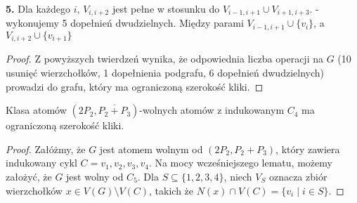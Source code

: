 \documentclass[polish]{beamer}
\begin{document}
\begin{frame}

    \textbf{5.} Dla każdego $i$, $V_{i,i+2}$ jest pełne w stosunku do $V_{i-1,i+1} \cup V_{i+1,i+3}$. - wykonujemy 
    5 dopełnień dwudzielnych. Między parami $V_{i-1, i+1} \cup \{v_i\}$, a $V_{i, i+2} \cup \{v_{i+1}\}$
    \begin{figure}[h]
        \centering
    \end{figure}
\end{frame}

\begin{frame}
    \begin{proof}      
        Z powyższych twierdzeń wynika, że odpowiednia liczba operacji na $G$ (10 usunięć wierzchołków, 1 dopełnienia podgrafu, 6 dopełnień dwudzielnych) prowadzi do grafu, który ma ograniczoną szerokość kliki.
        \end{proof}
\end{frame}

\begin{frame}
    \begin{lemma}
        Klasa atomów $(2P_2, \overline{P_2 + P_3})$-wolnych atomów z indukowanym $C_4$ ma ograniczoną szerokość kliki.
    \end{lemma}
    \begin{proof}
        \renewcommand{\qedsymbol}{}
        Załóżmy, że $G$ jest atomem wolnym od $(2P_2, P_2 + P_3)$, który zawiera indukowany cykl $C = v_1, v_2, v_3, v_4$. Na mocy wcześniejszego lematu, możemy założyć, że $G$ jest wolny od $C_5$. Dla $S \subseteq \{1, 2, 3, 4\}$, niech $V_S$ oznacza zbiór wierzchołków $x \in V(G) \setminus V(C)$, takich że $N(x) \cap V(C) = \{v_i \mid i \in S\}$.
    \end{proof}
\end{frame}
\end{document}
